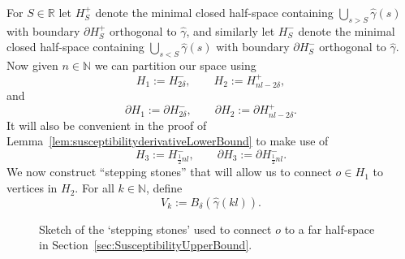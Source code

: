 \documentclass[10pt,a4paper,dvipsnames]{article}
\theoremstyle{definition}
\theoremstyle{remark}
\newcommand{\R}{\mathbb R}
\newcommand{\N}{\mathbb N}
\newcommand{\orig}{o}
\numberwithin{equation}{section}
\begin{document}
For $S\in\R$ let $H^+_S$ denote the minimal closed half-space containing $\bigcup_{s>S}\hat{\gamma}\left(s\right)$ with boundary $\partial H^+_S$ orthogonal to $\hat{\gamma}$, and similarly let $H^-_S$ denote the minimal closed half-space containing $\bigcup_{s<S}\hat{\gamma}\left(s\right)$ with boundary $\partial H^-_S$ orthogonal to $\hat{\gamma}$. Now given $n\in\N$ we can partition our space using 
\begin{equation}
    H_1 := H^-_{2\delta}, \qquad H_2:= H^+_{nl-2\delta},
\end{equation}
and
\begin{equation}
    \partial H_1:= \partial H^-_{2\delta},\qquad \partial H_2:=\partial H^+_{nl - 2\delta}.
\end{equation}
It will also be convenient in the proof of Lemma~\ref{lem:susceptibilityderivativeLowerBound} to make use of
\begin{equation}
    H_3 := H^-_{\frac{1}{2}nl},\qquad\partial H_3:=\partial H^-_{\frac{1}{2}nl}.
\end{equation}
We now construct ``stepping stones'' that will allow us to connect $\orig\in H_1$ to vertices in $H_2$. For all $k\in\N$, define
\begin{equation}\label{eq:vkVk}
    V_k:= B_\delta\left(\hat{\gamma}(kl)\right).
\end{equation}





\begin{figure}
    \centering
    \caption{Sketch of the `stepping stones' used to connect $\orig$ to a far half-space in Section~\ref{sec:SusceptibilityUpperBound}.}
    \label{fig:SteppingStones}
\end{figure}
\end{document}
